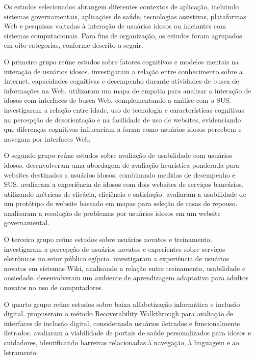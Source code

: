 Os estudos selecionados abrangem diferentes contextos de aplicação, incluindo sistemas governamentais, aplicações de saúde, tecnologias assistivas, plataformas Web e pesquisas voltadas à interação de usuários idosos ou iniciantes com sistemas computacionais. Para fins de organização, os estudos foram agrupados em oito categorias, conforme descrito a seguir.

O primeiro grupo reúne estudos sobre fatores cognitivos e modelos mentais na interação de usuários idosos. \cite{sharit2008information} investigaram a relação entre conhecimento sobre a Internet, capacidades cognitivas e desempenho durante atividades de busca de informações na Web. \cite{allah2021empathy} utilizaram um mapa de empatia para analisar a interação de idosos com interfaces de busca Web, complementando a análise com o SUS. \cite{crabb2014age} investigaram a relação entre idade, uso de tecnologia e características cognitivas na percepção de desorientação e na facilidade de uso de websites, evidenciando que diferenças cognitivas influenciam a forma como usuários idosos percebem e navegam por interfaces Web.

O segundo grupo reúne estudos sobre avaliação de usabilidade com usuários idosos. \cite{weighted_heuristic} desenvolveram uma abordagem de avaliação heurística ponderada para websites destinados a usuários idosos, combinando medidas de desempenho e SUS. \cite{gatsou2017seniors} avaliaram a experiência de idosos com dois websites de serviços bancários, utilizando métricas de eficácia, eficiência e satisfação. \cite{xie2010usability} avaliaram a usabilidade de um protótipo de website baseado em mapas para seleção de casas de repouso. \cite{health_problem_solving} analisaram a resolução de problemas por usuários idosos em um website governamental.

O terceiro grupo reúne estudos sobre usuários novatos e treinamento. \cite{nosseir2011novice} investigaram a percepção de usuários novatos e experientes sobre serviços eletrônicos no setor público egípcio. \cite{cowan2011exploring} investigaram a experiência de usuários novatos em sistemas Wiki, analisando a relação entre treinamento, usabilidade e ansiedade. \cite{kabassi2004personalised} desenvolveram um ambiente de aprendizagem adaptativo para adultos novatos no uso de computadores.

O quarto grupo reúne estudos sobre baixa alfabetização informática e inclusão digital. \cite{filgueiras2009recoverability} propuseram o método Recoverability Walkthrough para avaliação de interfaces de inclusão digital, considerando usuários iletrados e funcionalmente iletrados. \cite{barron2013feasibility} avaliaram a viabilidade de portais de saúde personalizados para idosos e cuidadores, identificando barreiras relacionadas à navegação, à linguagem e ao letramento.

